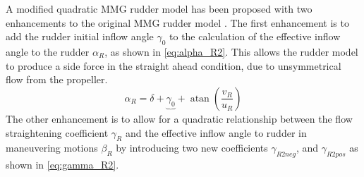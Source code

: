 A modified quadratic MMG rudder model has been proposed with two enhancements to the original MMG rudder model \citep{yasukawaIntroductionMMGStandard2015}. The first enhancement is to add the rudder initial inflow angle $\gamma_0$ to the calculation of the effective inflow angle to the rudder $\alpha_R$, as shown in \autoref{eq:alpha_R2}. This allows the rudder model to produce a side force in the straight ahead condition, due to unsymmetrical flow from the propeller. 
\begin{equation}
    \label{eq:alpha_R2}
    \alpha_{R} = \delta + \underbrace{\gamma_{0}}_{~} + \operatorname{atan}{\left(\frac{v_{R}}{u_{R}} \right)}
\end{equation}
The other enhancement is to allow for a quadratic relationship between the flow straightening coefficient $\gamma_R$ and the effective inflow angle to rudder in maneuvering motions $\beta_R$ by introducing two new coefficients $\gamma_{R2neg}$, and $\gamma_{R2pos}$ as shown in \autoref{eq:gamma_R2}.
\begin{equation}
    \label{eq:gamma_R2}
    
\end{equation}

